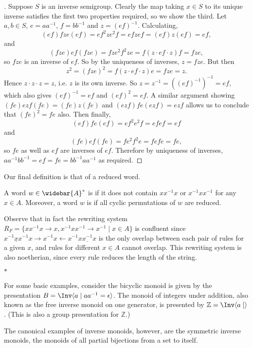 \documentclass[noindex,noinsetproof,12pt]{lmaths}
\newcommand{\paradec}{\par\begin{center}$\ast$\end{center}}
\newcommand{\Abar}{\widebar{A}}
\begin{document}
\begin{proof}[ ]
	Suppose $S$ is an inverse semigroup. Clearly the map taking $x \in S$ to its unique inverse satisfies the first two properties required, so we show the third. Let $a, b \in S$, $e = aa^{-1}$, $f = bb^{-1}$ and $z = (ef)^{-1}$. Calculating,
	\[ (ef)fze(ef) = ef^2ze^2f = efzef = (ef)z(ef) = ef, \]
	and
	\[ (fze)ef(fze) = fze^2f^2ze = f(z\cdot ef\cdot z)f = fze, \]
	so $fze$ is an inverse of $ef$. So by the uniqueness of inverses, $z = fze$. But then
	\[ z^2 = (fze)^2 = f(z\cdot ef \cdot z)e = fze = z. \]
	Hence $z\cdot z\cdot z = z$, i.e. $z$ is its own inverse. So $z = z^{-1} = ((ef)^{-1})^{-1} = ef$, which also gives $(ef)^{-1} = ef$ and $(ef)^2 = ef$. A similar argument showing $(fe)ezf(fe) = (fe)z(fe)$ and $(ezf)fe(ezf) = ezf$ allows us to conclude that $(fe)^2 = fe$ also. Then finally,
	\[ (ef)fe(ef) = ef^2e^2f = efef = ef \]
	and
	\[ (fe)ef(fe) = fe^2f^2e = fefe = fe, \]
	so $fe$ as well as $ef$ are inverses of $ef$. Therefore by uniqueness of inverses, $aa^{-1}bb^{-1} = ef = fe = bb^{-1}aa^{-1}$ as required.
\end{proof}

Our final definition is that of a reduced word.

\begin{defn}
	A word $w \in \Abar^*$ is  if it does not contain $xx^{-1}x$ or $x^{-1}xx^{-1}$ for any $x \in A$. Moreover, a word $w$ is  if all cyclic permutations of $w$ are reduced.
\end{defn}

Observe that in fact the rewriting system $R_F = \{ xx^{-1}x \to x, x^{-1}xx^{-1} \to x^{-1} \mid x \in A\}$ is confluent since $\underline{x^{-1}xx^{-1}}x \to x^{-1}x \leftarrow x^{-1}\underline{xx^{-1}x}$ is the only overlap between each pair of rules for a given $x$, and rules for different $x \in A$ cannot overlap. This rewriting system is also noetherian, since every rule reduces the length of the string.

\paradec
For some basic examples, consider the bicyclic monoid is given by the presentation $B = \Inv \langle a \mid aa^{-1} = \epsilon \rangle$. The monoid of integers under addition, also known as the free inverse monoid on one generator, is presented by $\mathbb{Z} = \Inv \langle a \mid \rangle$. (This is also a group presentation for $\mathbb{Z}$.)

The canonical examples of inverse monoids, however, are the symmetric inverse monoids, the monoids of all partial bijections from a set to itself.
\end{document}
